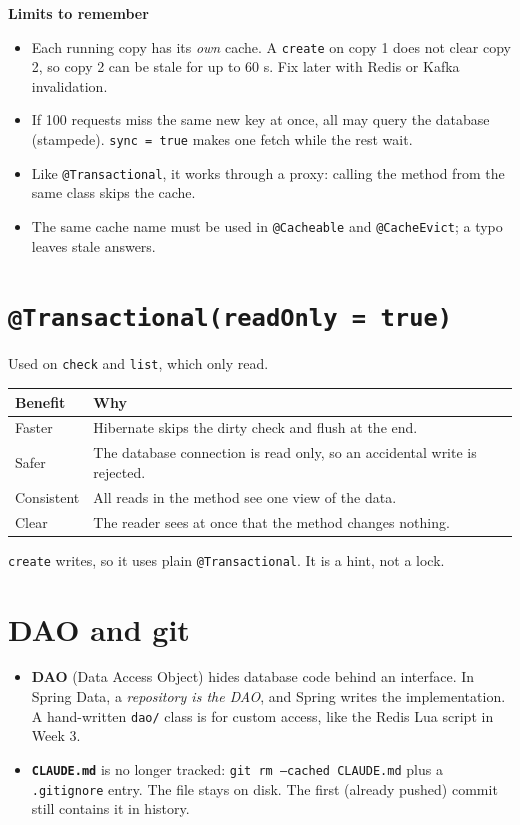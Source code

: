 \documentclass[11pt,a4paper]{article}
\newcommand{\code}[1]{\texttt{\small #1}}
\begin{document}
\textbf{Limits to remember}
\begin{itemize}
  \item Each running copy has its \emph{own} cache. A \code{create} on copy 1 does not clear copy 2, so copy 2 can be stale for up to 60 s. Fix later with Redis or Kafka invalidation.
  \item If 100 requests miss the same new key at once, all may query the database (stampede). \code{sync = true} makes one fetch while the rest wait.
  \item Like \code{@Transactional}, it works through a proxy: calling the method from the same class skips the cache.
  \item The same cache name must be used in \code{@Cacheable} and \code{@CacheEvict}; a typo leaves stale answers.
\end{itemize}

\section{\texttt{@Transactional(readOnly = true)}}

Used on \code{check} and \code{list}, which only read.

\begin{tabular}{@{}p{4.2cm}p{11.6cm}@{}}
\toprule
\textbf{Benefit} & \textbf{Why} \\
\midrule
Faster & Hibernate skips the dirty check and flush at the end. \\
Safer & The database connection is read only, so an accidental write is rejected. \\
Consistent & All reads in the method see one view of the data. \\
Clear & The reader sees at once that the method changes nothing. \\
\bottomrule
\end{tabular}

\code{create} writes, so it uses plain \code{@Transactional}. It is a hint, not a lock.

\section{DAO and git}

\begin{itemize}
  \item \textbf{DAO} (Data Access Object) hides database code behind an interface. In Spring Data, a \emph{repository is the DAO}, and Spring writes the implementation. A hand-written \code{dao/} class is for custom access, like the Redis Lua script in Week 3.
  \item \textbf{\code{CLAUDE.md}} is no longer tracked: \code{git rm --cached CLAUDE.md} plus a \code{.gitignore} entry. The file stays on disk. The first (already pushed) commit still contains it in history.
\end{itemize}
\end{document}
